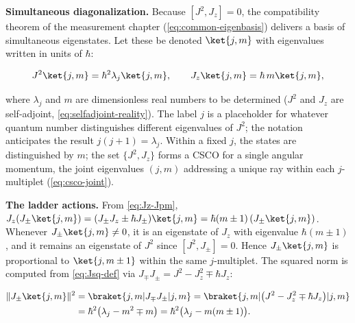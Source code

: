 \medskip\noindent\textbf{Simultaneous diagonalization.} Because $[J^2,J_z]=0$, the compatibility theorem of the measurement chapter (\eqref{eq:common-eigenbasis}) delivers a basis of simultaneous eigenstates. Let these be denoted $\ket{j,m}$ with eigenvalues written in units of $\hbar$:
\begin{linenomath}
    \begin{equation}
        J^2\ket{j,m} = \hbar^2\lambda_j\ket{j,m},\qquad
        J_z\ket{j,m} = \hbar\,m\ket{j,m},
    \end{equation}
\end{linenomath}
where $\lambda_j$ and $m$ are dimensionless real numbers to be determined ($J^2$ and $J_z$ are self-adjoint, \eqref{eq:selfadjoint-reality}). The label $j$ is a placeholder for whatever quantum number distinguishes different eigenvalues of $J^2$; the notation anticipates the result $j(j+1)=\lambda_j$. Within a fixed $j$, the states are distinguished by $m$; the set $\{J^2,J_z\}$ forms a CSCO for a single angular momentum, the joint eigenvalues $(j,m)$ addressing a unique ray within each $j$-multiplet (\eqref{eq:csco-joint}).

\medskip\noindent\textbf{The ladder actions.} From \eqref{eq:Jz-Jpm}, $J_z(J_\pm\ket{j,m}) = (J_\pm J_z \pm \hbar J_\pm)\ket{j,m} = \hbar(m\pm1)\,(J_\pm\ket{j,m})$. Whenever $J_\pm\ket{j,m} \neq 0$, it is an eigenstate of $J_z$ with eigenvalue $\hbar(m\pm1)$, and it remains an eigenstate of $J^2$ since $[J^2,J_\pm]=0$. Hence $J_\pm\ket{j,m}$ is proportional to $\ket{j,m\pm1}$ within the same $j$-multiplet. The squared norm is computed from \eqref{eq:Jsq-def} via $J_\mp J_\pm = J^2 - J_z^2 \mp \hbar J_z$:
\begin{linenomath}
    \begin{align}
        \|J_\pm\ket{j,m}\|^2
        &= \braket{j,m|J_\mp J_\pm|j,m}
        = \braket{j,m|\bigl(J^2 - J_z^2 \mp \hbar J_z\bigr)|j,m} \notag\\
        &= \hbar^2\bigl(\lambda_j - m^2 \mp m\bigr)
        = \hbar^2\bigl(\lambda_j - m(m\pm1)\bigr).
        \label{eq:Jpm-norm}
    \end{align}
\end{linenomath}


